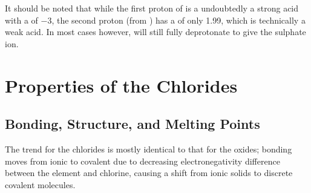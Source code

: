 
				It should be noted that while the first proton of  is a undoubtedly a strong acid with a \pKa{} of \num{-3}, the second
				proton (from ) has a \pKa{} of only \num{1.99}, which is technically a weak acid. In most cases however,  will
				still fully deprotonate to give the sulphate ion.





	\pagebreak
	\section{Properties of the Chlorides}

		\subsection{Bonding, Structure, and Melting Points}

			The trend for the chlorides is mostly identical to that for the oxides; bonding moves from ionic to covalent due to decreasing
			electronegativity difference between the element and chlorine, causing a shift from ionic solids to discrete covalent molecules.

